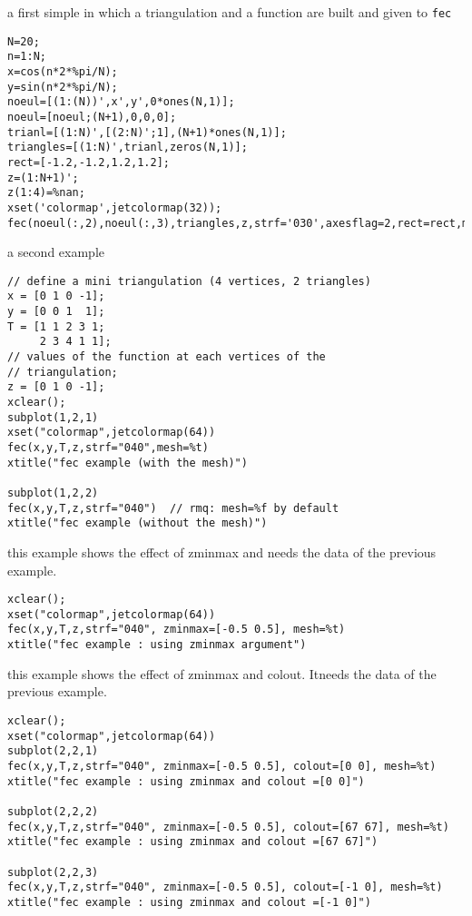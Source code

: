 \begin{examples}

\noindent a first simple in which a triangulation and a function are
built and given to \verb!fec!
\begin{Verbatim}
N=20;
n=1:N;
x=cos(n*2*%pi/N);
y=sin(n*2*%pi/N);
noeul=[(1:(N))',x',y',0*ones(N,1)];
noeul=[noeul;(N+1),0,0,0];
trianl=[(1:N)',[(2:N)';1],(N+1)*ones(N,1)];
triangles=[(1:N)',trianl,zeros(N,1)];
rect=[-1.2,-1.2,1.2,1.2];
z=(1:N+1)';
z(1:4)=%nan;
xset('colormap',jetcolormap(32));
fec(noeul(:,2),noeul(:,3),triangles,z,strf='030',axesflag=2,rect=rect,mesh=%t);
\end{Verbatim}

\noindent a second example

\begin{Verbatim}
// define a mini triangulation (4 vertices, 2 triangles)
x = [0 1 0 -1];
y = [0 0 1  1];
T = [1 1 2 3 1;
     2 3 4 1 1];
// values of the function at each vertices of the
// triangulation;
z = [0 1 0 -1];
xclear();
subplot(1,2,1)
xset("colormap",jetcolormap(64))
fec(x,y,T,z,strf="040",mesh=%t)
xtitle("fec example (with the mesh)")

subplot(1,2,2)
fec(x,y,T,z,strf="040")  // rmq: mesh=%f by default
xtitle("fec example (without the mesh)")
\end{Verbatim}

\noindent this example shows the effect of zminmax
and needs the data of the previous example.

\begin{Verbatim}
xclear();
xset("colormap",jetcolormap(64))
fec(x,y,T,z,strf="040", zminmax=[-0.5 0.5], mesh=%t)
xtitle("fec example : using zminmax argument")
\end{Verbatim}

\noindent this example shows the effect of zminmax
and colout. Itneeds the data of the previous example.

\begin{Verbatim}
xclear();
xset("colormap",jetcolormap(64))
subplot(2,2,1)
fec(x,y,T,z,strf="040", zminmax=[-0.5 0.5], colout=[0 0], mesh=%t)
xtitle("fec example : using zminmax and colout =[0 0]")

subplot(2,2,2)
fec(x,y,T,z,strf="040", zminmax=[-0.5 0.5], colout=[67 67], mesh=%t)
xtitle("fec example : using zminmax and colout =[67 67]")

subplot(2,2,3)
fec(x,y,T,z,strf="040", zminmax=[-0.5 0.5], colout=[-1 0], mesh=%t)
xtitle("fec example : using zminmax and colout =[-1 0]")


\end{Verbatim}
\end{examples}
